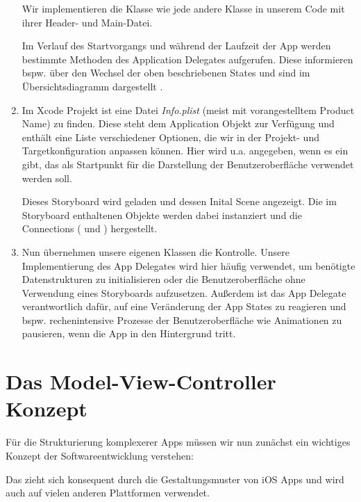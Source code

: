 \documentclass[parskip=half, final]{scrreprt}
\begin{document}
\begin{enumerate}
Wir implementieren die Klasse  wie jede andere Klasse in unserem Code mit ihrer Header- und Main-Datei.

Im Verlauf des Startvorgangs und während der Laufzeit der App werden bestimmte Methoden des Application Delegates aufgerufen. Diese informieren bspw. über den Wechsel der oben beschriebenen States und sind im Übersichtsdiagramm dargestellt .

\item Im Xcode Projekt ist eine Datei \emph{Info.plist} (meist mit vorangestelltem Product Name) zu finden. Diese steht dem Application Objekt zur Verfügung und enthält eine Liste verschiedener Optionen, die wir in der Projekt- und Targetkonfiguration anpassen können. Hier wird u.a. angegeben, wenn es ein  gibt, das als Startpunkt für die Darstellung der Benutzeroberfläche verwendet werden soll.

Dieses Storyboard wird geladen und dessen Inital Scene angezeigt. Die im Storyboard enthaltenen Objekte werden dabei instanziert und die Connections ( und ) hergestellt.

\item Nun übernehmen unsere eigenen Klassen die Kontrolle. Unsere Implementierung des App Delegates wird hier häufig verwendet, um benötigte Datenstrukturen zu initialisieren oder die Benutzeroberfläche ohne Verwendung eines Storyboards aufzusetzen. Außerdem ist das App Delegate verantwortlich dafür, auf eine Veränderung der App States  zu reagieren und bspw. rechenintensive Prozesse der Benutzeroberfläche wie Animationen zu pausieren, wenn die App in den Hintergrund tritt.

\end{enumerate}

\clearpage


\section{Das Model-View-Controller Konzept}\label{sec:mvc}

Für die Strukturierung komplexerer Apps müssen wir nun zunächst ein wichtiges Konzept der Softwareentwicklung verstehen:

Das  zieht sich konsequent durch die Gestaltungsmuster von iOS Apps und wird auch auf vielen anderen Plattformen verwendet.
\end{document}
